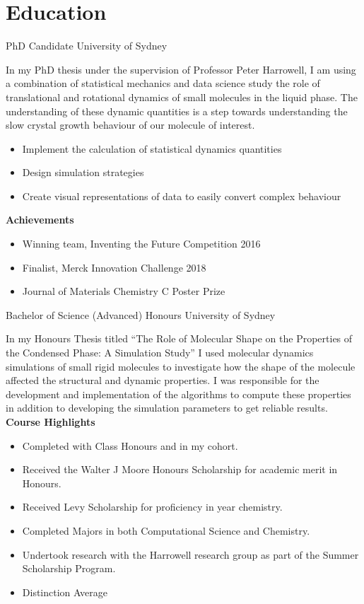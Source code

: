 



\makecvtitle

\vspace{-4em}
\section{Education}

{PhD Candidate}
{University of Sydney}{}{}
{%
In my PhD thesis under the supervision of Professor Peter Harrowell,
I am using a combination of
statistical mechanics and data science
study the role of translational and rotational dynamics
of small molecules in the liquid phase.
The understanding of these dynamic quantities is a step
towards understanding the slow crystal growth behaviour of
our molecule of interest.
\begin{itemize}
  \item Implement the calculation of statistical dynamics quantities
  \item Design simulation strategies
  \item Create visual representations of data to easily convert complex behaviour
\end{itemize}
\textbf{Achievements}
\begin{itemize}
  \item Winning team, Inventing the Future Competition 2016
  \item Finalist, Merck Innovation Challenge 2018
  \item Journal of Materials Chemistry C Poster Prize
\end{itemize}
}

{Bachelor of Science (Advanced) Honours}
{University of Sydney}{}{}
{%
In my Honours Thesis titled
``The Role of Molecular Shape on the Properties of the Condensed Phase: A Simulation Study''
I used molecular dynamics simulations of small rigid molecules to investigate how
the shape of the molecule affected the structural and dynamic properties.
I was responsible for the development and implementation of the algorithms to
compute these properties in addition to developing the simulation parameters
to get reliable results.
\textbf{Course Highlights}
\begin{itemize}
  \item Completed with  Class Honours and  in my cohort.
  \item Received the Walter J Moore Honours Scholarship for academic merit in Honours.
  \item Received Levy Scholarship for proficiency in  year chemistry.
  \item Completed Majors in both Computational Science and Chemistry.
  \item Undertook research with the Harrowell research group as part of the Summer Scholarship Program.
  \item Distinction Average
\end{itemize}
}

